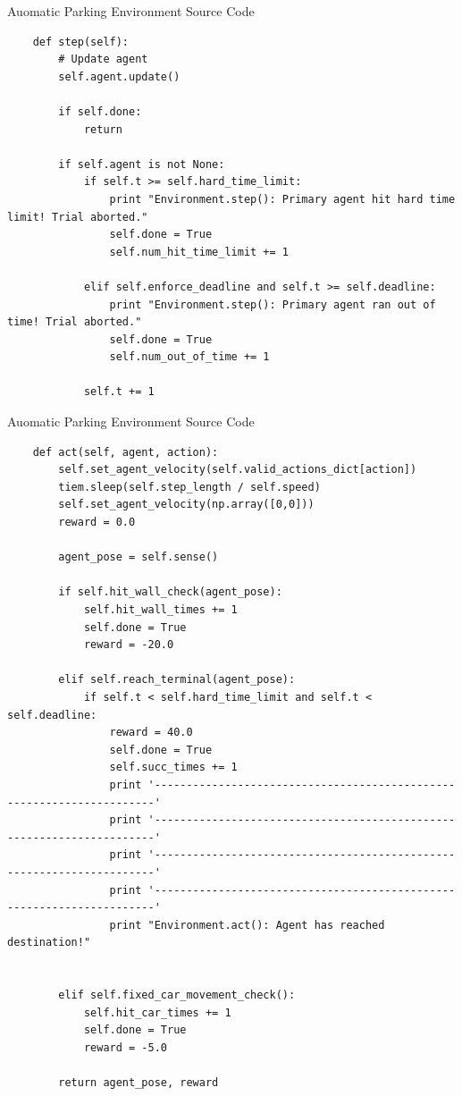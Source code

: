 \documentclass{beamer}
\begin{document}
\begin{frame}[fragile]{Auomatic Parking Environment Source Code}
\tiny{
\begin{verbatim}
    def step(self):
        # Update agent
        self.agent.update()

        if self.done:
            return

        if self.agent is not None:
            if self.t >= self.hard_time_limit:
                print "Environment.step(): Primary agent hit hard time limit! Trial aborted."
                self.done = True
                self.num_hit_time_limit += 1

            elif self.enforce_deadline and self.t >= self.deadline:
                print "Environment.step(): Primary agent ran out of time! Trial aborted."
                self.done = True
                self.num_out_of_time += 1

            self.t += 1
\end{verbatim}
}
\end{frame}


\begin{frame}[fragile]{Auomatic Parking Environment Source Code}
\tiny{
\begin{verbatim}
    def act(self, agent, action):
        self.set_agent_velocity(self.valid_actions_dict[action])
        tiem.sleep(self.step_length / self.speed)
        self.set_agent_velocity(np.array([0,0]))
        reward = 0.0

        agent_pose = self.sense()

        if self.hit_wall_check(agent_pose):
            self.hit_wall_times += 1
            self.done = True
            reward = -20.0

        elif self.reach_terminal(agent_pose):
            if self.t < self.hard_time_limit and self.t < self.deadline:
                reward = 40.0
                self.done = True
                self.succ_times += 1
                print '----------------------------------------------------------------------'
                print '----------------------------------------------------------------------'
                print '----------------------------------------------------------------------'
                print '----------------------------------------------------------------------'
                print "Environment.act(): Agent has reached destination!"


        elif self.fixed_car_movement_check():
            self.hit_car_times += 1
            self.done = True
            reward = -5.0

        return agent_pose, reward
\end{verbatim}
}
\end{frame}
\end{document}
